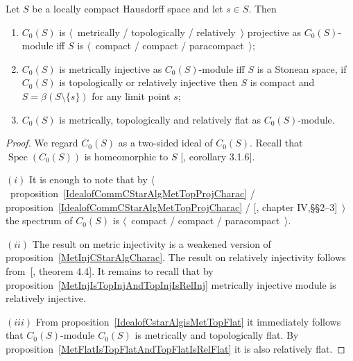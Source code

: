 \begin{proposition}\label{C0SC0SModMetTopRelProjInjFlat} Let $S$ be a locally
compact Hausdorff space and let $s\in S$. Then

\begin{enumerate}[label = (\roman*)]
    \item $C_0(S)$ is $\langle$~metrically / 
    topologically / relatively~$\rangle$
    projective as $C_0(S)$-module iff $S$ is $\langle$~compact / compact /
    paracompact~$\rangle$;

    \item $C_0(S)$ is metrically injective as $C_0(S)$-module iff $S$ is 
    a Stonean space, if $C_0(S)$ is topologically or relatively injective then
    $S$ is compact and $S=\beta(S\setminus \{ s\})$ for any limit point $s$;

    \item $C_0(S)$ is metrically, topologically and relatively flat as
    $C_0(S)$-module.
\end{enumerate}
\end{proposition}
\begin{proof} We regard $C_0(S)$ as a two-sided ideal of $C_0(S)$. Recall that
$\operatorname{Spec}(C_0(S))$ is homeomorphic to $S$ [\cite{HelHomolBanTopAlg},
corollary 3.1.6].

$(i)$ It is enough to note that by
$\langle$~proposition~\ref{IdealofCommCStarAlgMetTopProjCharac} /
proposition~\ref{IdealofCommCStarAlgMetTopProjCharac} /
[\cite{HelHomolBanTopAlg}, chapter IV,\S\S 2--3]~$\rangle$ the spectrum of
$C_0(S)$ is $\langle$~compact / compact / paracompact~$\rangle$. 

$(ii)$ The result on metric injectivity is a weakened version of
proposition~\ref{MetInjCStarAlgCharac}. The result on relatively injectivity 
follows from~[\cite{NemANoteOnRelInjC0ModC0}, theorem 4.4]. It remains to recall
that by proposition~\ref{MetInjIsTopInjAndTopInjIsRelInj} metrically injective
module is relatively injective.

$(iii)$ From proposition~\ref{IdealofCstarAlgisMetTopFlat} it immediately follows
that $C_0(S)$-module $C_0(S)$ is metrically and topologically flat. By
proposition~\ref{MetFlatIsTopFlatAndTopFlatIsRelFlat} it is also relatively
flat.
\end{proof}

